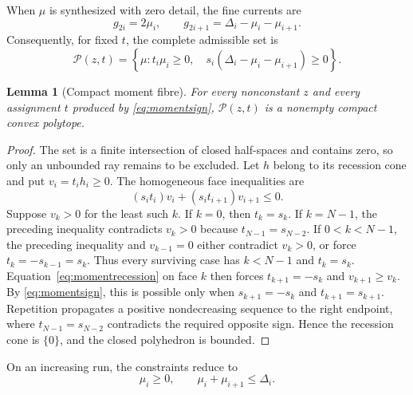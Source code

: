 \documentclass[journal]{IEEEtran}
\newtheorem{lemma}{Lemma}
\newcommand{\Pcal}{\mathcal{P}}
\begin{document}
When \(\mu\) is synthesized with zero detail, the fine currents are
\begin{equation}
 g_{2i}=2\mu_i,\qquad
 g_{2i+1}=\Delta_i-\mu_i-\mu_{i+1}.
 \label{eq:finecurrentmoment}
\end{equation}
Consequently, for fixed \(t\), the complete admissible set is
\begin{equation}
 \Pcal(z,t)=\left\{\mu:
 t_i\mu_i\geq0,\quad
 s_i(\Delta_i-\mu_i-\mu_{i+1})\geq0
 \right\}.
 \label{eq:momentpolytope}
\end{equation}
\begin{lemma}[Compact moment fibre]
For every nonconstant \(z\) and every assignment \(t\) produced by
\eqref{eq:momentsign}, \(\Pcal(z,t)\) is a nonempty compact convex polytope.
\end{lemma}

\begin{proof}
The set is a finite intersection of closed half-spaces and contains zero, so
only an unbounded ray remains to be excluded. Let \(h\) belong to its
recession cone and put \(v_i=t_ih_i\geq0\). The homogeneous face inequalities
are
\begin{equation}
 (s_it_i)v_i+(s_it_{i+1})v_{i+1}\leq0.
 \label{eq:momentrecession}
\end{equation}
Suppose \(v_k>0\) for the least such \(k\). If \(k=0\), then \(t_k=s_k\).
If \(k=N-1\), the preceding inequality contradicts \(v_k>0\) because
\(t_{N-1}=s_{N-2}\). If \(0<k<N-1\), the preceding inequality and
\(v_{k-1}=0\) either contradict \(v_k>0\), or force
\(t_k=-s_{k-1}=s_k\). Thus every surviving case has \(k<N-1\) and
\(t_k=s_k\). Equation~\eqref{eq:momentrecession} on face \(k\) then forces
\(t_{k+1}=-s_k\) and \(v_{k+1}\geq v_k\). By
\eqref{eq:momentsign}, this is possible only when
\(s_{k+1}=-s_k\) and \(t_{k+1}=s_{k+1}\). Repetition propagates a positive
nondecreasing sequence to the right endpoint, where
\(t_{N-1}=s_{N-2}\) contradicts the required opposite sign. Hence the
recession cone is \(\{0\}\), and the closed polyhedron is bounded.
\end{proof}

On an increasing run, the constraints reduce to
\begin{equation}
 \mu_i\geq0,\qquad \mu_i+\mu_{i+1}\leq\Delta_i.
 \label{eq:monotonemoment}
\end{equation}
\end{document}
